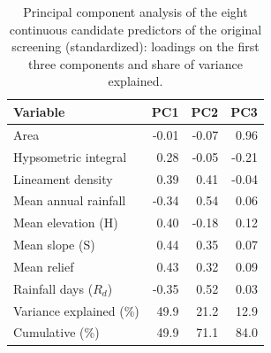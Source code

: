 \begin{table}[h]
\caption{Principal component analysis of the eight continuous candidate predictors of the original screening (standardized): loadings on the first three components and share of variance explained.}\label{tabA2pca}
\footnotesize
\begin{tabular}{@{}lrrr@{}}
\toprule
Variable & PC1 & PC2 & PC3 \\
\midrule
Area & -0.01 & -0.07 & 0.96 \\
Hypsometric integral & 0.28 & -0.05 & -0.21 \\
Lineament density & 0.39 & 0.41 & -0.04 \\
Mean annual rainfall & -0.34 & 0.54 & 0.06 \\
Mean elevation (H) & 0.40 & -0.18 & 0.12 \\
Mean slope (S) & 0.44 & 0.35 & 0.07 \\
Mean relief & 0.43 & 0.32 & 0.09 \\
Rainfall days ($R_d$) & -0.35 & 0.52 & 0.03 \\
\midrule
Variance explained (\%) & 49.9 & 21.2 & 12.9 \\
Cumulative (\%) & 49.9 & 71.1 & 84.0 \\
\bottomrule
\end{tabular}
\end{table}
